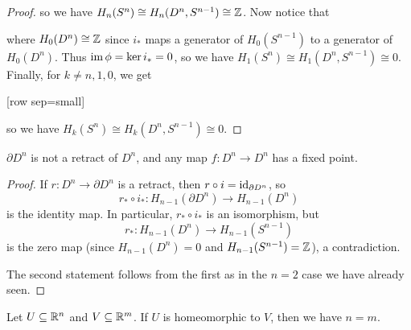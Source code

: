 \begin{proof}
  so we have
  $H_n(S^n) \cong H_{n}(D^n, S^{n - 1}) \cong \mathbb{Z}$.
  Now notice that
  \begin{center}
  \end{center}
  where $H_0(D^n) \cong \mathbb{Z}$ since $i_*$ maps a
  generator of $H_0(S^{n - 1})$ to a generator of
  $H_0(D^n)$. Thus $\operatorname{im} \phi = \ker i_* = 0$, so we have
  $H_1(S^n) \cong H_1(D^n, S^{n - 1}) \cong 0$.
  Finally, for $k \ne n, 1, 0$, we get
  \begin{center}[row sep=small]
  \end{center}
  so we have $H_k(S^n) \cong H_k(D^n, S^{n - 1}) \cong 0$.
\end{proof}

\begin{corollary}
  $\partial D^n$ is not a retract of $D^n$, and
  any map $f : D^n \to D^n$ has a fixed point.
\end{corollary}

\begin{proof}
  If $r : D^n \to \partial D^n$ is a retract, then
  $r \circ i = \operatorname{id}_{\partial D^n}$, so
  \[
    r_* \circ i_* : H_{n - 1}(\partial D^n) \to H_{n - 1}(D^n)
  \]
  is the identity map. In particular, $r_* \circ i_*$
  is an isomorphism, but
  \[
    r_* : H_{n - 1}(D^n) \to H_{n - 1}(S^{n - 1})
  \]
  is the zero map
  (since $H_{n - 1}(D^n) = 0$ and
  $H_{n - 1}(S^{n - 1}) = \mathbb{Z}$), a contradiction.

  The second statement follows from the first as
  in the $n = 2$ case we have already seen.
\end{proof}

\begin{corollary}
  Let $U \subseteq \mathbb{R}^n$ and $V \subseteq \mathbb{R}^m$.
  If $U$ is homeomorphic to $V$, then we have $n = m$.
\end{corollary}

